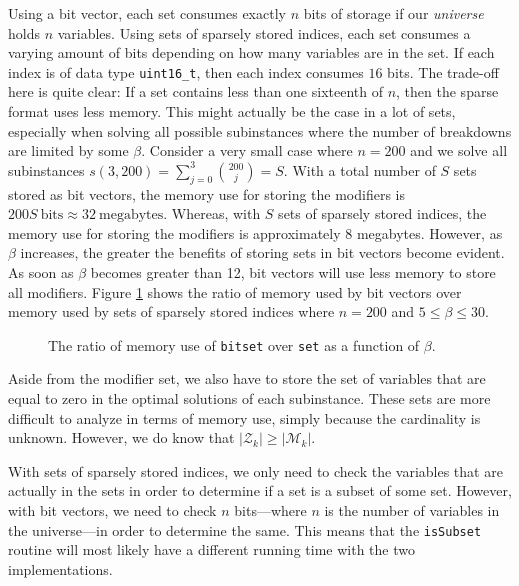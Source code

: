 Using a bit vector, each set consumes exactly $n$ bits of storage if our
\emph{universe} holds $n$ variables.
Using sets of sparsely stored indices, each set consumes a varying amount of
bits depending on how many variables are in the set. If each index is of data
type \texttt{uint16\_t}, then each index consumes $16$ bits. The trade-off
here is quite clear: If a set contains less than one sixteenth of $n$, then
the sparse format uses less memory. This might actually be the case in a lot
of sets, especially when solving all possible subinstances where the number
of breakdowns are limited by some $\beta$. Consider a very small case where
$n = 200$ and we solve all subinstances
$s(3, 200) = \sum_{j=0}^{3} {\binom{200}{j}} = S$.
With a total number of $S$ sets stored as bit vectors, the memory use for
storing the modifiers is $200S~\textrm{bits} \approx 32~\textrm{megabytes}$.
Whereas, with $S$ sets of sparsely stored indices, the memory use for storing
the modifiers is approximately $8$ megabytes. However, as $\beta$ increases,
the greater the benefits of storing sets in bit vectors become evident. As soon
as $\beta$ becomes greater than 12, bit vectors will use less memory to store all
modifiers. Figure \ref{fig:bmem} shows the ratio of memory used by bit vectors
over memory used by sets of sparsely stored indices where $n = 200$ and
$5 \leq \beta \leq 30$.
\begin{figure}[ht!]
\centering

\caption{The ratio of memory use of \texttt{bitset} over \texttt{set} as a
         function of $\beta$.}
\label{fig:bmem}
\end{figure}
Aside from the modifier set, we also have to store the set of variables that
are equal to zero in the optimal solutions of each subinstance. These sets
are more difficult to analyze in terms of memory use, simply because the
cardinality is unknown. However, we do know that $|\mathcal{Z}_k| \geq
|\mathcal{M}_k|$.

With sets of sparsely stored indices, we only need to check the variables
that are actually in the sets in order to determine if a set is a subset
of some set. However, with bit vectors, we need to check $n$ bits---where $n$
is the number of variables in the universe---in order to determine the same.
This means that the \texttt{isSubset} routine will most likely have a different
running time with the two implementations.

